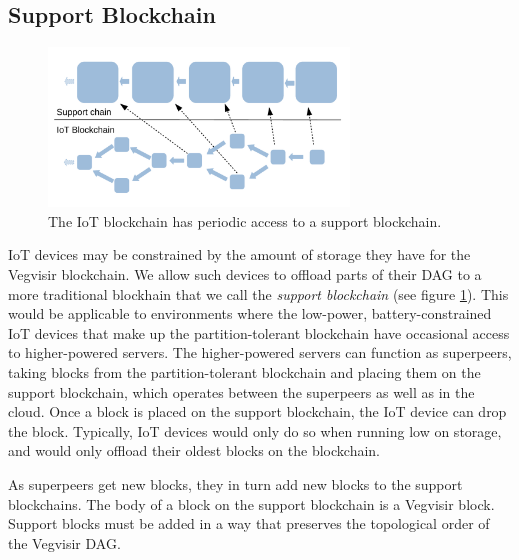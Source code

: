 \documentclass[conference, letterpaper]{IEEEtran}
\begin{document}
\subsection{Support Blockchain}

\begin{figure}
\centering
\includegraphics[width=8cm]{mainline}
\caption{The IoT blockchain has periodic access to a support blockchain.}
\label{fig:supportchain}
\end{figure}

IoT devices may be constrained by the amount of storage they have for the Vegvisir blockchain.  We allow such devices to offload parts of their DAG to a more traditional blockhain that we call the \emph{support blockchain} (see figure \ref{fig:supportchain}). This would be applicable to environments where the low-power, battery-constrained IoT devices that make up the partition-tolerant blockchain have occasional access to higher-powered servers. The higher-powered servers can function as superpeers, taking blocks from the partition-tolerant blockchain and placing them on the support blockchain, which operates between the superpeers as well as in the cloud.  Once a block is placed on the support blockchain, the IoT device can drop the block.  Typically, IoT devices would only do so when running low on storage, and would only offload their oldest blocks on the blockchain.

As superpeers get new blocks, they in turn add new blocks to the support blockchains. The body of a block on the support blockchain is a Vegvisir block. Support blocks must be added in a way that preserves the topological order of the Vegvisir DAG.
\end{document}
